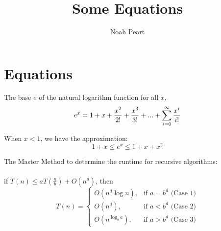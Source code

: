 \documentclass{article}
\begin{document}
\title{Some Equations}
\author{Noah Peart}

\maketitle

\section{Equations}
The base $e$ of the natural logarithm function for all $x$,
\begin{equation}
  \label{Natural Log}
  e^{x} = 1 + x + \frac{x^{2}}{2!} + \frac{x^{3}}{3!} + ... +  \sum_{\mathclap{i=0}}^{\infty} \frac{x^{i}}{i!}
\end{equation}

When $x < 1$, we have the approximation:
\begin{equation}
  1 + x \leq e^{x} \leq 1 + x + x^{2}
\end{equation}

The Master Method to determine the runtime for recursive algorithms: \\
\\
if $T(n) \leq aT(\frac{n}{b}) + O(n^d)$, then
\begin{equation}
  T(n) = \begin{cases} O(n^d\log n), & \mbox{if } a = b^d\mbox{ (Case 1)} \\ O(n^d), & \mbox{if } a < b^d\mbox{ (Case 2)} \\
  O(n^{\log_b a}), & \mbox{if } a > b^d\mbox{ (Case 3)} \end{cases}
\end{equation}
\end{document}
